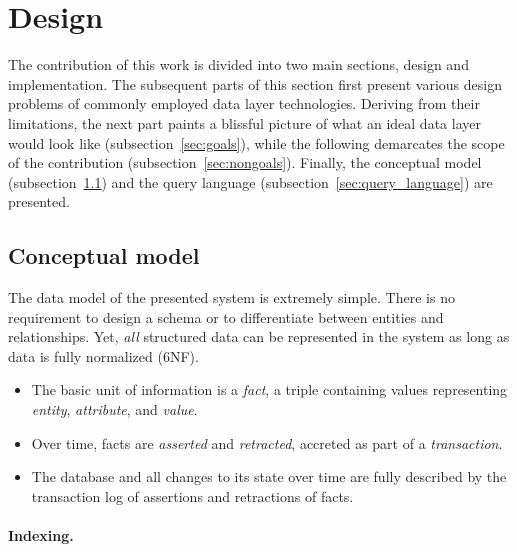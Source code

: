 \section{Design}\label{sec:design}

The contribution of this work is divided into two main sections, design and implementation. The subsequent parts of this section first present various design problems of commonly employed data layer technologies. Deriving from their limitations, the next part paints a blissful picture of what an ideal data layer would look like (subsection~\ref{sec:goals}), while the following demarcates the scope of the contribution (subsection~\ref{sec:nongoals}). Finally, the conceptual model (subsection~\ref{sec:conceptual_model}) and the query language (subsection~\ref{sec:query_language}) are presented.





\subsection{Conceptual model}\label{sec:conceptual_model}

The data model of the presented system is extremely simple. There is no requirement to design a schema or to differentiate between entities and relationships. Yet, \emph{all} structured data can be represented in the system as long as data is fully normalized (6NF).

\begin{itemize}
  \item The basic unit of information is a \emph{fact}, a triple \lisp{[e a v]} containing values representing \emph{entity}, \emph{attribute}, and \emph{value}.

  \item Over time, facts are \emph{asserted} and \emph{retracted}, accreted as part of a \emph{transaction}.

  \item The database and all changes to its state over time are fully described by the transaction log of assertions and retractions of facts.
\end{itemize}

\paragraph{Indexing.}

